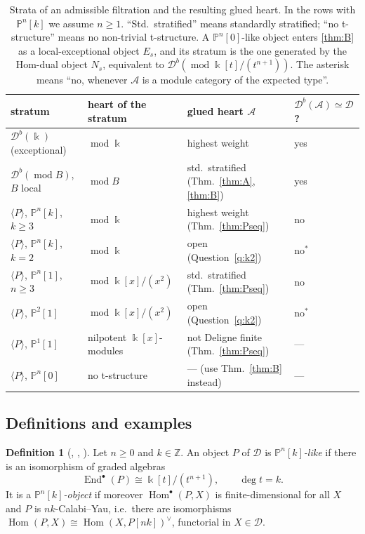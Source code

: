 \documentclass[11pt,reqno]{amsart}
\theoremstyle{plain}
\theoremstyle{definition}
\newtheorem{definition}[theorem]{Definition}
\theoremstyle{remark}
\newcommand{\kk}{\Bbbk}
\DeclareMathOperator{\Hom}{Hom}
\DeclareMathOperator{\End}{End}
\newcommand{\modd}{\operatorname{mod}}
\newcommand{\Db}{\mathcal{D}^b}
\newcommand{\thick}[1]{\langle #1\rangle}
\newcommand{\Pn}[2]{\mathbb{P}^{#1}[#2]}
\newcommand{\cD}{\mathcal{D}}
\newcommand{\cA}{\mathcal{A}}
\begin{document}
\begin{table}[ht]
\centering
\renewcommand{\arraystretch}{1.25}
\small
\begin{tabular}{@{}llll@{}}
\toprule
stratum & heart of the stratum & glued heart $\cA$ & $\Db(\cA)\simeq\cD$? \\
\midrule
$\Db(\kk)$ (exceptional) & $\modd\kk$ & highest weight \cite{BB26} & yes \\
$\Db(\modd B)$, $B$ local & $\modd B$ & std.\ stratified (Thm.~\ref{thm:A}, \ref{thm:B}) & yes \\
$\thick P$, $\Pn nk$, $k\ge 3$ & $\modd\kk$ & highest weight (Thm.~\ref{thm:Pseq}) & no \\
$\thick P$, $\Pn nk$, $k=2$ & $\modd\kk$ & open (Question~\ref{q:k2}) & no$^{\ast}$ \\
$\thick P$, $\Pn n1$, $n\ge 3$ & $\modd\kk[x]/(x^2)$ & std.\ stratified (Thm.~\ref{thm:Pseq}) & no \\
$\thick P$, $\Pn 21$ & $\modd\kk[x]/(x^2)$ & open (Question~\ref{q:k2}) & no$^{\ast}$ \\
$\thick P$, $\Pn 11$ & nilpotent $\kk[x]$-modules & not Deligne finite (Thm.~\ref{thm:Pseq}) & --- \\
$\thick P$, $\Pn n0$ & no t-structure \cite{Bonf26} & --- (use Thm.~\ref{thm:B} instead) & --- \\
\bottomrule
\end{tabular}
\caption{Strata of an admissible filtration and the resulting glued heart. In the rows with $\Pn nk$ we assume $n\ge1$. ``Std.\ stratified'' means standardly stratified; ``no t-structure'' means no non-trivial t-structure. A $\Pn n0$-like object enters \cref{thm:B} as a local-exceptional object $E_s$, and its stratum is the one generated by the Hom-dual object $N_s$, equivalent to $\Db(\modd\kk[t]/(t^{n+1}))$. The asterisk means ``no, whenever $\cA$ is a module category of the expected type''.}\label{tab:summary}
\end{table}


\subsection{Definitions and examples}

\begin{definition}[{\cite{Kru18}, \cite[Def.~2.1]{HK19}, \cite[Def.~2.1]{Bonf26}}]\label{def:Pnk}
Let $n\ge0$ and $k\in\mathbb{Z}$. An object $P$ of $\cD$ is \emph{$\Pn nk$-like} if there is an isomorphism of graded algebras
\[\End^\bullet(P)\cong\kk[t]/(t^{n+1}),\qquad\deg t=k.\]
It is a \emph{$\Pn nk$-object} if moreover $\Hom^\bullet(P,X)$ is finite-dimensional for all $X$ and $P$ is $nk$-Calabi--Yau, i.e.\ there are isomorphisms $\Hom(P,X)\cong\Hom(X,P[nk])^\vee$, functorial in $X\in\cD$.
\end{definition}
\end{document}
